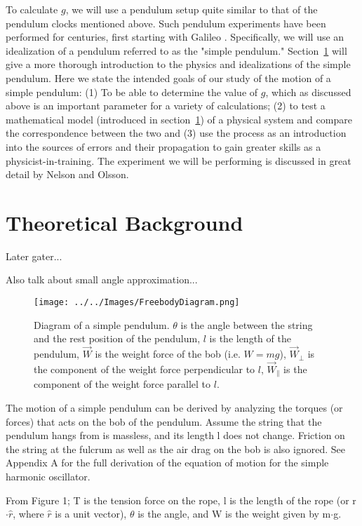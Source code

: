 \documentclass[iop]{emulateapj}
\def\g{$g$}
\begin{document}
To calculate \g, we will use a pendulum setup quite similar to that of the
pendulum clocks mentioned above.  Such pendulum experiments have been 
performed for centuries, first starting with Galileo \citet{Murin}. 
Specifically, we will use an idealization of a pendulum referred to as the 
"simple pendulum." Section~\ref{sec:theory} will give a more thorough 
introduction to the physics and idealizations of the simple pendulum.  
Here we state the intended 
goals of our study of the motion of a simple pendulum:  (1) To be able to 
determine the value of \g, which as discussed above is an important parameter
for a variety of calculations; (2) to test a mathematical model (introduced in 
section~\ref{sec:theory}) of a physical system and compare the correspondence 
between the two and (3) use the process as an introduction into the sources of 
errors and their propagation to gain greater skills as a physicist-in-training. 
The experiment we will be performing is discussed in great detail by 
Nelson and Olsson. \citet{Nelson} 

\section{Theoretical Background}
\label{sec:theory}


Later gater...

Also talk about small angle approximation...


\begin{figure}[H]
\centering
\texttt{[image: ../../Images/FreebodyDiagram.png]}
\caption{Diagram of a simple pendulum. 
$\theta$ is the angle between the string
and the rest position of the pendulum, $l$ is the length of the pendulum,
$\vec{W}$ is the weight force of the bob (i.e. $W = mg$), $\vec{W}_\perp$ is the 
component of the weight force perpendicular to $l$, $\vec{W}_\parallel$ 
is the component of the weight force parallel to $l$.}
\label{Pendulum}
\end{figure}


The motion of a simple pendulum can be derived by analyzing the torques (or forces) that acts 
on the bob of the pendulum. Assume the string that the pendulum hangs from is massless, and
its length l does not change. Friction on the string at the fulcrum as well as the
air drag on the bob is also ignored. See Appendix A for the full derivation
of the equation of motion for the simple harmonic oscillator.


From Figure 1; T is the tension force on the rope, l is the length of the
rope (or r$\cdot\hat{r}$, where $\hat{r}$ is a unit vector), $\theta$ is the angle, and W is the weight given by m$\cdot$g.
\end{document}
